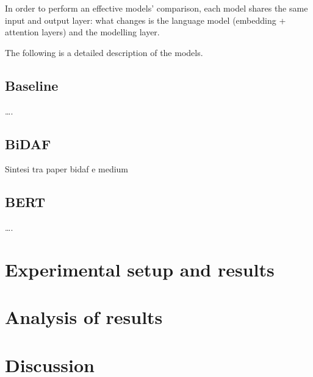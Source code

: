 \documentclass[a4paper,10pt]{report}
\begin{document}
In order to perform an effective models’ comparison, each model shares the same input and output layer: what changes is the language model (embedding + attention layers) and the modelling layer.

The following is a detailed description of the models.

\section{Baseline}\label{sec:baseline}

….

\section{BiDAF}\label{sec:bidaf}

Sintesi tra paper bidaf e medium

\section{BERT}\label{sec:bert}

….

\chapter{Experimental setup and results}\label{chap:experiments}

\chapter{Analysis of results}\label{chap:analysis-results}

\chapter{Discussion}\label{chap:discussion}

\printbibliography
\end{document}
